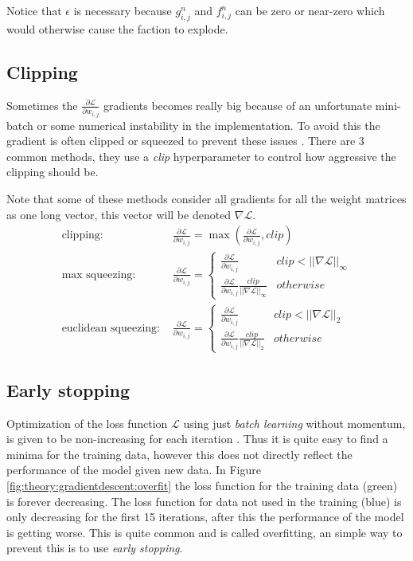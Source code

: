 Notice that $\epsilon$ is necessary because $g_{i,j}^n$ and $f_{i,j}^n$ can be zero or near-zero which would otherwise cause the faction to explode.

\subsection{Clipping}

Sometimes the $\frac{\partial \mathcal{L}}{\partial w_{i,j}}$ gradients becomes really big because of an unfortunate mini-batch or some numerical instability in the implementation. To avoid this the gradient is often clipped or squeezed to prevent these issues \cite{graves-generating-sequences}. There are 3 common methods, they use a \textit{clip} hyperparameter to control how aggressive the clipping should be.

Note that some of these methods consider all gradients for all the weight matrices as one long vector, this vector will be denoted $\nabla \mathcal{L}$.
\begin{align}
\text{clipping: } & \frac{\partial \mathcal{L}}{\partial w_{i,j}} = \max\left(\frac{\partial \mathcal{L}}{\partial w_{i,j}}, clip\right) \\
\text{max squeezing: } & \frac{\partial \mathcal{L}}{\partial w_{i,j}} = \begin{cases}
	\frac{\partial \mathcal{L}}{\partial w_{i,j}} & clip < ||\nabla \mathcal{L}||_{\infty} \\
	\frac{\partial \mathcal{L}}{\partial w_{i,j}} \frac{clip}{||\nabla \mathcal{L}||_{\infty}} & otherwise
\end{cases} \\
\text{euclidean squeezing: } & \frac{\partial \mathcal{L}}{\partial w_{i,j}} = \begin{cases}
	\frac{\partial \mathcal{L}}{\partial w_{i,j}} & clip < ||\nabla \mathcal{L}||_2 \\
	\frac{\partial \mathcal{L}}{\partial w_{i,j}} \frac{clip}{||\nabla \mathcal{L}||_2} & otherwise
\end{cases}
\end{align}

\subsection{Early stopping}

Optimization of the loss function $\mathcal{L}$ using just \textit{batch learning} without momentum, is given to be non-increasing for each iteration \cite{bishop}. Thus it is quite easy to find a minima for the training data, however this does not directly reflect the performance of the model given new data. In Figure \ref{fig:theory:gradientdescent:overfit} the loss function for the training data (green) is forever decreasing. The loss function for data not used in the training (blue) is only decreasing for the first 15 iterations, after this the performance of the model is getting worse. This is quite common and is called overfitting, an simple way to prevent this is to use \textit{early stopping}.

